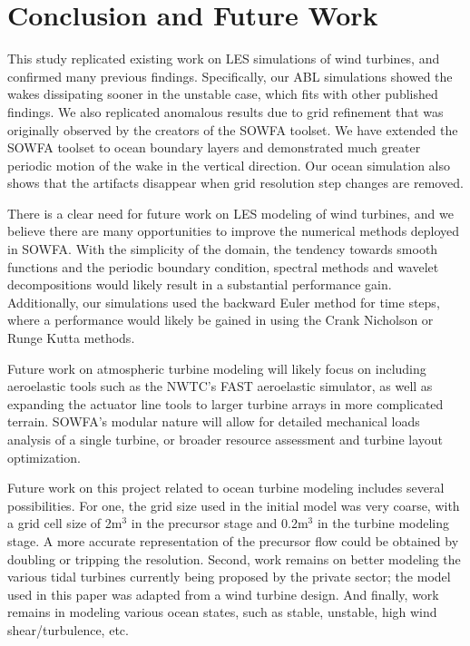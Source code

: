 \section{Conclusion and Future Work}
This study replicated existing work on LES simulations of wind turbines, and confirmed many previous findings.  Specifically, our ABL simulations showed the wakes dissipating sooner in the unstable case, which fits with other published findings.  We also replicated anomalous results due to grid refinement that was originally observed by the creators of the SOWFA toolset.  We have extended the SOWFA toolset to ocean boundary layers and demonstrated much greater periodic motion of the wake in the vertical direction.  Our ocean simulation also shows that the artifacts disappear when grid resolution step changes are removed.

There is a clear need for future work on LES modeling of wind turbines, and we believe there are many opportunities to improve the numerical methods deployed in SOWFA.  With the simplicity of the domain, the tendency towards smooth functions and the periodic boundary condition, spectral methods and wavelet decompositions would likely result in a substantial performance gain. Additionally, our simulations used the backward Euler method for time steps, where a performance would likely be gained in using the Crank Nicholson or Runge Kutta methods.

Future work on atmospheric turbine modeling will likely focus on including aeroelastic tools such as the NWTC's FAST aeroelastic simulator, as well as expanding the actuator line tools to larger turbine arrays in more complicated terrain.  SOWFA's modular nature will allow for detailed mechanical loads analysis of a single turbine, or broader resource assessment and turbine layout optimization.

Future work on this project related to ocean turbine modeling includes several possibilities. For one, the grid size used in the initial model was very coarse, with a grid cell size of 2m$^3$ in the precursor stage and 0.2m$^3$ in the turbine modeling stage. A more accurate representation of the precursor flow could be obtained by doubling or tripping the resolution. Second, work remains on better modeling the various tidal turbines currently being proposed by the private sector; the model used in this paper was adapted from a wind turbine design. And finally, work remains in modeling various ocean states, such as stable, unstable, high wind shear/turbulence, etc.



